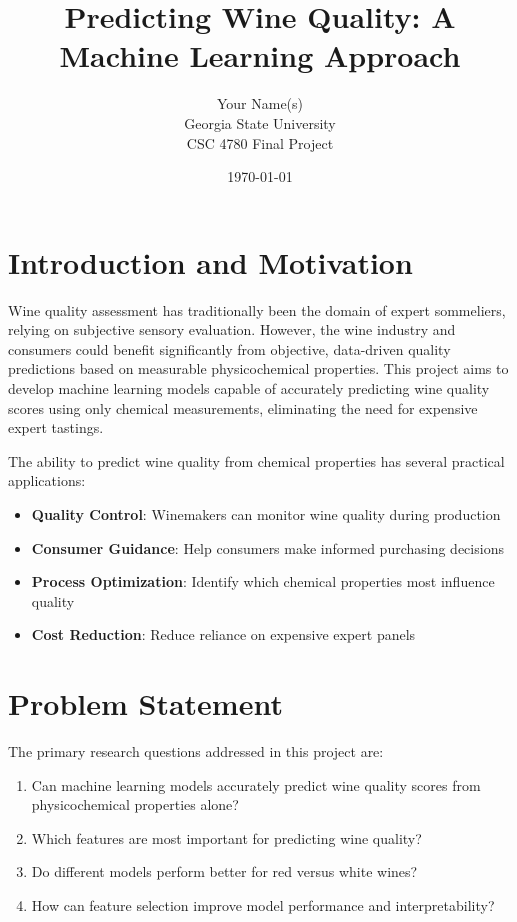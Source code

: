\documentclass[12pt]{article}
\title{Predicting Wine Quality: A Machine Learning Approach}
\author{Your Name(s) \\ Georgia State University \\ CSC 4780 Final Project}
\date{\today}
\begin{document}
\maketitle

\tableofcontents
\newpage

\section{Introduction and Motivation}

Wine quality assessment has traditionally been the domain of expert sommeliers, relying on subjective sensory evaluation. However, the wine industry and consumers could benefit significantly from objective, data-driven quality predictions based on measurable physicochemical properties. This project aims to develop machine learning models capable of accurately predicting wine quality scores using only chemical measurements, eliminating the need for expensive expert tastings.

The ability to predict wine quality from chemical properties has several practical applications:
\begin{itemize}
    \item \textbf{Quality Control}: Winemakers can monitor wine quality during production
    \item \textbf{Consumer Guidance}: Help consumers make informed purchasing decisions
    \item \textbf{Process Optimization}: Identify which chemical properties most influence quality
    \item \textbf{Cost Reduction}: Reduce reliance on expensive expert panels
\end{itemize}

\section{Problem Statement}

The primary research questions addressed in this project are:
\begin{enumerate}
    \item Can machine learning models accurately predict wine quality scores from physicochemical properties alone?
    \item Which features are most important for predicting wine quality?
    \item Do different models perform better for red versus white wines?
    \item How can feature selection improve model performance and interpretability?
\end{enumerate}
\end{document}

